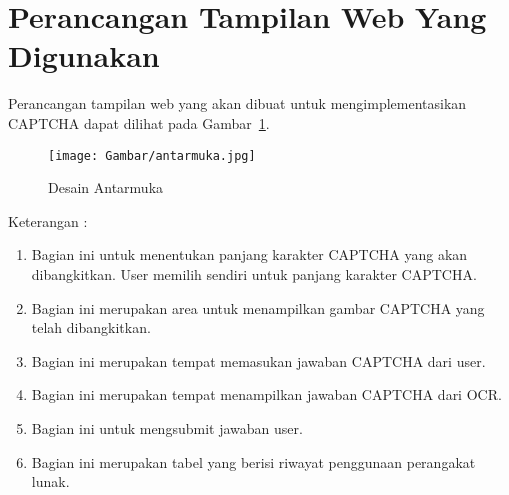 



\section{Perancangan Tampilan Web Yang Digunakan}
\label{sec:perancanganantarmuka}

Perancangan tampilan web yang akan dibuat untuk mengimplementasikan CAPTCHA dapat dilihat pada Gambar~\ref{fig:antarmuka}.

\begin{figure}[H]
\centering
\texttt{[image: Gambar/antarmuka.jpg]}
\caption[Desain Antarmuka]{Desain Antarmuka} 
\label{fig:antarmuka}
\end{figure}

Keterangan :
\begin{enumerate}
\item
Bagian ini untuk menentukan panjang karakter CAPTCHA yang akan dibangkitkan. User memilih sendiri untuk panjang karakter CAPTCHA.

\item
Bagian ini merupakan area untuk menampilkan gambar CAPTCHA yang telah dibangkitkan.

\item
Bagian ini merupakan tempat memasukan jawaban CAPTCHA dari user.

\item
Bagian ini merupakan tempat menampilkan jawaban CAPTCHA dari OCR.

\item
Bagian ini untuk mengsubmit jawaban user.

\item
Bagian ini merupakan tabel yang berisi riwayat penggunaan perangakat lunak.

\end{enumerate}

